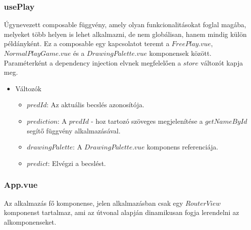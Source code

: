 \subsubsection{usePlay}
Úgynevezett composable függvény, amely olyan funkcionalitásokat foglal magába, melyeket több helyen is lehet alkalmazni, de nem globálisan, hanem mindig külön példányként. Ez a composable egy kapcsolatot teremt a $FreePlay.vue$, $NormalPlayGame.vue$ és a $DrawingPalette.vue$ komponensek között. Paraméterként a dependency injection elvnek megfelelően a $store$ változót kapja meg.
\begin{itemize}
    \item Változók
    \begin{itemize}
        \item $predId$: Az aktuális becslés azonosítója.
        \item $prediction$: A $predId$ - hoz tartozó szöveges megjelenítése a $getNameById$ segítő függvény alkalmazásával.
        \item $drawingPalette$: A $DrawingPalette.vue$ komponens referenciája.
        \item $predict$: Elvégzi a becslést.
    \end{itemize}
\end{itemize}

\subsubsection{App.vue}
Az alkalmazás fő komponense, jelen alkalmazásban csak egy $RouterView$ komponenst tartalmaz, ami az útvonal alapján dinamikusan fogja lerendelni az alkomponenseket.

